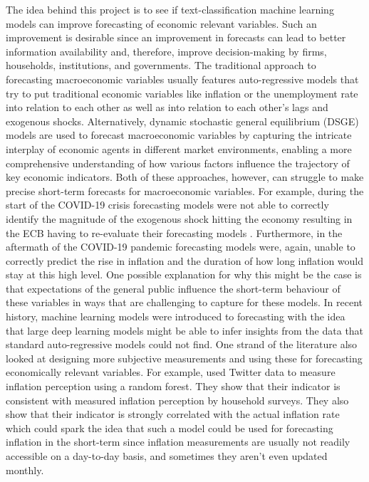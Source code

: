 \documentclass[11pt, a4paper, leqno]{article}
\begin{document}
The idea behind this project is to see if text-classification machine learning models can improve forecasting of economic relevant variables. Such an improvement is desirable since an improvement in forecasts can lead to better information availability and, therefore, improve decision-making by firms, households, institutions, and governments. The traditional approach to forecasting macroeconomic variables usually features auto-regressive models that try to put traditional economic variables like inflation or the unemployment rate into relation to each other as well as into relation to each other's lags and exogenous shocks. Alternatively, dynamic stochastic general equilibrium (DSGE) models are used to forecast macroeconomic variables by capturing the intricate interplay of economic agents in different market environments, enabling a more comprehensive understanding of how various factors influence the trajectory of key economic indicators. Both of these approaches, however, can struggle to make precise short-term forecasts for macroeconomic variables. For example, during the start of the COVID-19 crisis forecasting models were not able to correctly identify the magnitude of the exogenous shock hitting the economy resulting in the ECB having to re-evaluate their forecasting models \parencite{Battistini2021}. Furthermore, in the aftermath of the COVID-19 pandemic forecasting models were, again, unable to correctly predict the rise in inflation and the duration of how long inflation would stay at this high level. One possible explanation for why this might be the case is that expectations of the general public influence the short-term behaviour of these variables in ways that are challenging to capture for these models.
In recent history, machine learning models were introduced to forecasting with the idea that large deep learning models might be able to infer insights from the data that standard auto-regressive models could not find. One strand of the literature also looked at designing more subjective measurements and using these for forecasting economically relevant variables. For example, \textcite{Denes2022} used Twitter data to measure inflation perception using a random forest. They show that their indicator is consistent with measured inflation perception by household surveys. They also show that their indicator is strongly correlated with the actual inflation rate which could spark the idea that such a model could be used for forecasting inflation in the short-term since inflation measurements are usually not readily accessible on a day-to-day basis, and sometimes they aren't even updated monthly.
\end{document}
